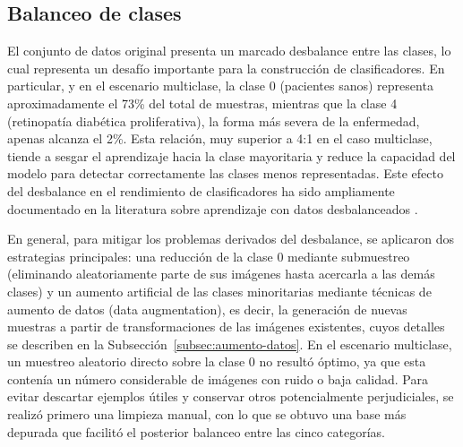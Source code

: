 \subsection{Balanceo de clases} \label{subsec:balanceo-clases}

El conjunto de datos original presenta un marcado desbalance entre las clases, lo cual 
representa un desafío importante para la construcción de clasificadores. En particular, y 
en el escenario multiclase, la clase 0 (pacientes sanos) representa aproximadamente el 
73\% del total de muestras, mientras que la clase 4 (retinopatía diabética 
proliferativa), la forma más severa de la enfermedad, apenas alcanza el 2\%. Esta 
relación, muy superior a 4:1 en el caso multiclase, tiende a sesgar el aprendizaje hacia 
la clase mayoritaria y reduce la capacidad del modelo para detectar correctamente las 
clases menos representadas. Este efecto del desbalance en el rendimiento de 
clasificadores ha sido ampliamente documentado en la literatura sobre aprendizaje con 
datos desbalanceados  .

En general, para mitigar los problemas derivados del desbalance, se aplicaron dos
estrategias principales: una reducción de la clase 0 mediante submuestreo (eliminando
aleatoriamente parte de sus imágenes hasta acercarla a las demás clases) y un aumento
artificial de las clases minoritarias mediante técnicas de aumento de datos (data
augmentation), es decir, la generación de nuevas muestras a partir de transformaciones
de las imágenes existentes, cuyos detalles se describen en la
Subsección~\ref{subsec:aumento-datos}. En el escenario multiclase, un muestreo aleatorio directo sobre la
clase 0 no resultó óptimo, ya que esta contenía un número considerable de imágenes con 
ruido o baja calidad. Para evitar descartar ejemplos útiles y conservar otros 
potencialmente perjudiciales, se realizó primero una limpieza manual, con lo que se 
obtuvo una base más depurada que facilitó el posterior balanceo entre las cinco 
categorías.

